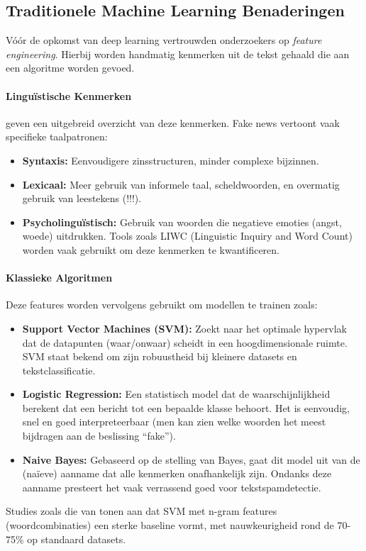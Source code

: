 \subsection{Traditionele Machine Learning Benaderingen}
Vóór de opkomst van deep learning vertrouwden onderzoekers op \textit{feature engineering}. Hierbij worden handmatig kenmerken uit de tekst gehaald die aan een algoritme worden gevoed.

\paragraph{Linguïstische Kenmerken}
\textcite{shu2017fake} geven een uitgebreid overzicht van deze kenmerken. Fake news vertoont vaak specifieke taalpatronen:
\begin{itemize}
    \item \textbf{Syntaxis:} Eenvoudigere zinsstructuren, minder complexe bijzinnen.
    \item \textbf{Lexicaal:} Meer gebruik van informele taal, scheldwoorden, en overmatig gebruik van leestekens (!!!).
    \item \textbf{Psycholinguïstisch:} Gebruik van woorden die negatieve emoties (angst, woede) uitdrukken. Tools zoals LIWC (Linguistic Inquiry and Word Count) worden vaak gebruikt om deze kenmerken te kwantificeren.
\end{itemize}

\paragraph{Klassieke Algoritmen}
Deze features worden vervolgens gebruikt om modellen te trainen zoals:
\begin{itemize}
    \item \textbf{Support Vector Machines (SVM):} Zoekt naar het optimale hypervlak dat de datapunten (waar/onwaar) scheidt in een hoogdimensionale ruimte. SVM staat bekend om zijn robuustheid bij kleinere datasets en tekstclassificatie.
    \item \textbf{Logistic Regression:} Een statistisch model dat de waarschijnlijkheid berekent dat een bericht tot een bepaalde klasse behoort. Het is eenvoudig, snel en goed interpreteerbaar (men kan zien welke woorden het meest bijdragen aan de beslissing ``fake'').
    \item \textbf{Naive Bayes:} Gebaseerd op de stelling van Bayes, gaat dit model uit van de (naïeve) aanname dat alle kenmerken onafhankelijk zijn. Ondanks deze aanname presteert het vaak verrassend goed voor tekstspamdetectie.
\end{itemize}
Studies zoals die van \textcite{perez2018automatic} tonen aan dat SVM met n-gram features (woordcombinaties) een sterke baseline vormt, met nauwkeurigheid rond de 70-75\% op standaard datasets.

